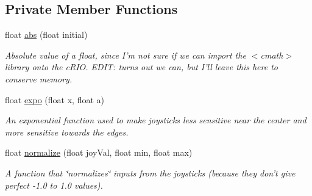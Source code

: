 \subsection*{Private Member Functions}
\begin{DoxyCompactItemize}
\item 
float \hyperlink{class_r_j_f_r_c2011_1_1_controller_ac2c90813eff8dbebc38210c605d4b2d2}{abs} (float initial)
\begin{DoxyCompactList}\small\item\em Absolute value of a float, since I'm not sure if we can import the $<$cmath$>$ library onto the cRIO. EDIT: turns out we can, but I'll leave this here to conserve memory. \item\end{DoxyCompactList}\item 
float \hyperlink{class_r_j_f_r_c2011_1_1_controller_a70def9152e72c1745dccce7c3121f5ac}{expo} (float x, float a)
\begin{DoxyCompactList}\small\item\em An exponential function used to make joysticks less sensitive near the center and more sensitive towards the edges. \item\end{DoxyCompactList}\item 
float \hyperlink{class_r_j_f_r_c2011_1_1_controller_ac2e4beb60add909ce7c0716551501fcf}{normalize} (float joyVal, float min, float max)
\begin{DoxyCompactList}\small\item\em A function that \char`\"{}normalizes\char`\"{} inputs from the joysticks (because they don't give perfect -\/1.0 to 1.0 values). \item\end{DoxyCompactList}\end{DoxyCompactItemize}
